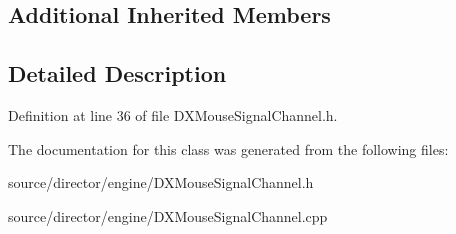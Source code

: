 \subsection*{Additional Inherited Members}


\subsection{Detailed Description}


Definition at line 36 of file D\-X\-Mouse\-Signal\-Channel.\-h.



The documentation for this class was generated from the following files\-:\begin{DoxyCompactItemize}
\item 
source/director/engine/D\-X\-Mouse\-Signal\-Channel.\-h\item 
source/director/engine/D\-X\-Mouse\-Signal\-Channel.\-cpp\end{DoxyCompactItemize}
